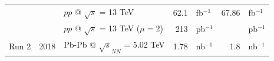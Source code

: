 \documentclass[encoding=utf8,british]{tumphthesis}
\begin{document}
\begin{table}[H]
\begin{tabular}{|c|r|l|rl|rl|}
\cellcolor[HTML]{CFE2F3}                         & \cellcolor[HTML]{CFE2F3}                       & $pp$ @ $\sqrt{s}$ = 13 TeV                                         & 62.1                         & fb$^{-1}$                             & 67.86                                        & fb$^{-1}$                             \\
\rowcolor[HTML]{CFE2F3} 
\cellcolor[HTML]{CFE2F3}                         & \cellcolor[HTML]{CFE2F3}                       & $pp$ @ $\sqrt{s}$ = 13 TeV ($\mu = 2$)                             & 213                          & pb$^{-1}$                             & \multicolumn{1}{l}{\cellcolor[HTML]{CFE2F3}} & pb$^{-1}$                               \\
\multirow{-14}{*}{\cellcolor[HTML]{CFE2F3}Run 2} & \multirow{-3}{*}{\cellcolor[HTML]{CFE2F3}2018} & Pb-Pb @ $\sqrt{s}_{NN}$ = 5.02 TeV                                 & 1.78                         & nb$^{-1}$                             & 1.8                                       & nb$^{-1}$                          \\ \hline 
\end{tabular}
\end{table}
\end{document}
